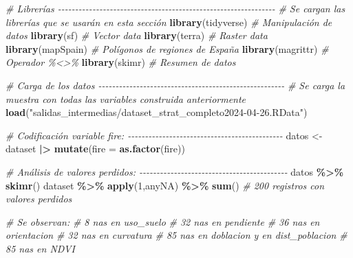 \documentclass[12pt,a4paper,]{book}
\newenvironment{Shaded}{\begin{snugshade}}{\end{snugshade}}
\newcommand{\AttributeTok}[1]{\textcolor[rgb]{0.13,0.29,0.53}{#1}}
\newcommand{\CommentTok}[1]{\textcolor[rgb]{0.56,0.35,0.01}{\textit{#1}}}
\newcommand{\DecValTok}[1]{\textcolor[rgb]{0.00,0.00,0.81}{#1}}
\newcommand{\FunctionTok}[1]{\textcolor[rgb]{0.13,0.29,0.53}{\textbf{#1}}}
\newcommand{\NormalTok}[1]{#1}
\newcommand{\OtherTok}[1]{\textcolor[rgb]{0.56,0.35,0.01}{#1}}
\newcommand{\SpecialCharTok}[1]{\textcolor[rgb]{0.81,0.36,0.00}{\textbf{#1}}}
\newcommand{\StringTok}[1]{\textcolor[rgb]{0.31,0.60,0.02}{#1}}
\numberwithin{dummy}{section}
\theoremstyle{ocrenumbox}
\theoremstyle{blacknumex}
\theoremstyle{blacknumbox}
\theoremstyle{ocrenum}
\theoremstyle{ocrenum}
\begin{document}
\begin{Shaded}
\begin{Highlighting}[]
\CommentTok{\# Librerías {-}{-}{-}{-}{-}{-}{-}{-}{-}{-}{-}{-}{-}{-}{-}{-}{-}{-}{-}{-}{-}{-}{-}{-}{-}{-}{-}{-}{-}{-}{-}{-}{-}{-}{-}{-}{-}{-}{-}{-}{-}{-}{-}{-}{-}{-}{-}{-}{-}{-}{-}{-}{-}{-}{-}{-}{-}{-}{-}{-}{-}{-}{-}}
\CommentTok{\# Se cargan las librerías que se usarán en esta sección}
\FunctionTok{library}\NormalTok{(tidyverse) }\CommentTok{\# Manipulación de datos }
\FunctionTok{library}\NormalTok{(sf) }\CommentTok{\# Vector data}
\FunctionTok{library}\NormalTok{(terra) }\CommentTok{\# Raster data}
\FunctionTok{library}\NormalTok{(mapSpain) }\CommentTok{\# Polígonos de regiones de España}
\FunctionTok{library}\NormalTok{(magrittr) }\CommentTok{\# Operador \%\textless{}\textgreater{}\% }
\FunctionTok{library}\NormalTok{(skimr) }\CommentTok{\# Resumen de datos}

\CommentTok{\# Carga de los datos {-}{-}{-}{-}{-}{-}{-}{-}{-}{-}{-}{-}{-}{-}{-}{-}{-}{-}{-}{-}{-}{-}{-}{-}{-}{-}{-}{-}{-}{-}{-}{-}{-}{-}{-}{-}{-}{-}{-}{-}{-}{-}{-}{-}{-}{-}{-}{-}{-}{-}{-}{-}{-}{-}}
\CommentTok{\# Se carga la muestra con todas las variables construida anteriormente}
\FunctionTok{load}\NormalTok{(}\StringTok{"salidas\_intermedias/dataset\_strat\_completo2024{-}04{-}26.RData"}\NormalTok{)}


\CommentTok{\# Codificación variable fire: {-}{-}{-}{-}{-}{-}{-}{-}{-}{-}{-}{-}{-}{-}{-}{-}{-}{-}{-}{-}{-}{-}{-}{-}{-}{-}{-}{-}{-}{-}{-}{-}{-}{-}{-}{-}{-}{-}{-}{-}{-}{-}{-}{-}{-}}
\NormalTok{datos }\OtherTok{\textless{}{-}}\NormalTok{ dataset }\SpecialCharTok{|\textgreater{}} 
  \FunctionTok{mutate}\NormalTok{(}\AttributeTok{fire =} \FunctionTok{as.factor}\NormalTok{(fire))}

\CommentTok{\# Análisis de valores perdidos: {-}{-}{-}{-}{-}{-}{-}{-}{-}{-}{-}{-}{-}{-}{-}{-}{-}{-}{-}{-}{-}{-}{-}{-}{-}{-}{-}{-}{-}{-}{-}{-}{-}{-}{-}{-}{-}{-}{-}{-}{-}{-}{-}}
\NormalTok{datos }\SpecialCharTok{\%\textgreater{}\%} \FunctionTok{skimr}\NormalTok{()}
\NormalTok{dataset }\SpecialCharTok{\%\textgreater{}\%} \FunctionTok{apply}\NormalTok{(}\DecValTok{1}\NormalTok{,anyNA) }\SpecialCharTok{\%\textgreater{}\%} \FunctionTok{sum}\NormalTok{() }\CommentTok{\# 200 registros con valores perdidos}

\CommentTok{\# Se observan:}
\CommentTok{\#   8 nas en uso\_suelo}
\CommentTok{\#   32 nas en pendiente}
\CommentTok{\#   36 nas en orientacion}
\CommentTok{\#   32 nas en curvatura}
\CommentTok{\#   85 nas en doblacion y en dist\_poblacion}
\CommentTok{\#   85 nas en NDVI}


\end{Highlighting}
\end{Shaded}
\end{document}
